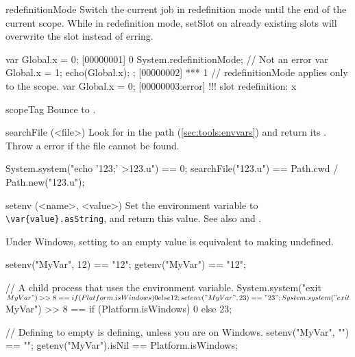 \begin{urbiscriptapi}
\item[redefinitionMode] Switch the current job in redefinition mode
  until the end of the current scope.  While in redefinition mode,
  setSlot on already existing slots will overwrite the slot instead of
  erring.

\begin{urbiscript}
var Global.x = 0;
[00000001] 0
{
  System.redefinitionMode;
  // Not an error
  var Global.x = 1;
  echo(Global.x);
};
[00000002] *** 1
// redefinitionMode applies only to the scope.
var Global.x = 0;
[00000003:error] !!! slot redefinition: x
\end{urbiscript}




\item[scopeTag] Bounce to .


\item[searchFile](<file>)%
  Look for  in the \urbi path (\autoref{sec:tools:envvars}) and
  return its .  Throw a 
  error if the file cannot be found.
\begin{urbiassert}
System.system("echo '123;' >123.u") == 0;
searchFile("123.u") == Path.cwd / Path.new("123.u");
\end{urbiassert}




\item[setenv](<name>, <value>)%
  Set the environment variable  to
  \lstinline|\var{value}.asString|, and return this value.  See also
   and .
  \begin{windows}
    Under Windows, setting to an empty value is equivalent to
    making undefined.
  \end{windows}

\begin{urbiassert}
setenv("MyVar", 12) == "12";
getenv("MyVar") == "12";

// A child process that uses the environment variable.
System.system("exit $MyVar") >> 8 ==
       {if (Platform.isWindows) 0 else 12};
setenv("MyVar", 23) == "23";
System.system("exit $MyVar") >> 8 ==
       {if (Platform.isWindows) 0 else 23};

// Defining to empty is defining, unless you are on Windows.
setenv("MyVar", "") == "";
getenv("MyVar").isNil == Platform.isWindows;
\end{urbiassert}



\end{urbiscriptapi}

